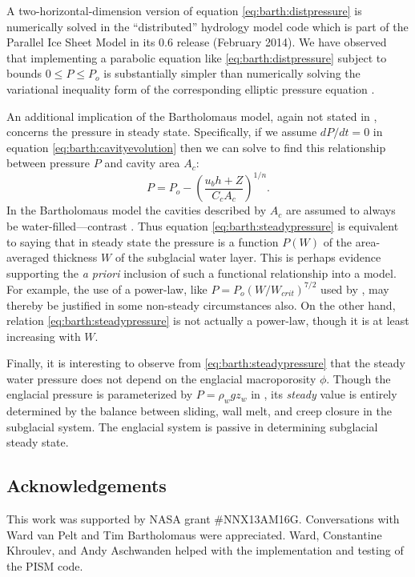 \documentclass[twocolumn,letterpaper]{igs}
\begin{document}
A two-horizontal-dimension version of equation \eqref{eq:barth:distpressure} is numerically solved in the ``distributed'' hydrology model code which is part of the Parallel Ice Sheet Model in its 0.6 release (February 2014).  We have observed that implementing a parabolic equation like \eqref{eq:barth:distpressure} subject to bounds $0 \le P \le P_o$ is substantially simpler than numerically solving the variational inequality form of the corresponding elliptic pressure equation \citep{Schoofetal2012}. 

An additional implication of the Bartholomaus model, again not stated in \cite{Bartholomausetal2011}, concerns the pressure in steady state.  Specifically, if we assume $dP/dt=0$ in equation \eqref{eq:barth:cavityevolution} then we can solve to find this relationship between pressure $P$ and cavity area $A_c$:
\begin{equation}
P = P_o - \left(\frac{u_b h + Z}{C_c A_c}\right)^{1/n}. \label{eq:barth:steadypressure}
\end{equation}
In the Bartholomaus model the cavities described by $A_c$ are assumed to always be water-filled---contrast \citep{Schoofetal2012}.  Thus equation \eqref{eq:barth:steadypressure} is equivalent to saying that in steady state the pressure is a function $P(W)$ of the area-averaged thickness $W$ of the subglacial water layer.  This is perhaps evidence supporting the \emph{a priori} inclusion of such a functional relationship into a model.  For example, the use of a power-law, like $P = P_o (W/W_{crit})^{7/2}$ used by \cite{FlowersClarke2002_theory}, may thereby be justified in some non-steady circumstances also.  On the other hand, relation \eqref{eq:barth:steadypressure} is not actually a power-law, though it is at least increasing with $W$.

Finally, it is interesting to observe from \eqref{eq:barth:steadypressure} that the steady water pressure does not depend on the englacial macroporosity $\phi$.  Though the englacial pressure is parameterized by $P=\rho_w g z_w$ in \cite{Bartholomausetal2011}, its \emph{steady} value is entirely determined by the balance between sliding, wall melt, and creep closure in the subglacial system.  The englacial system is passive in determining subglacial steady state.


\subsection*{Acknowledgements}  This work was supported by NASA grant \#NNX13AM16G.  Conversations with Ward van Pelt and Tim Bartholomaus were appreciated.  Ward, Constantine Khroulev, and Andy Aschwanden helped with the implementation and testing of the PISM code.



\end{document}

